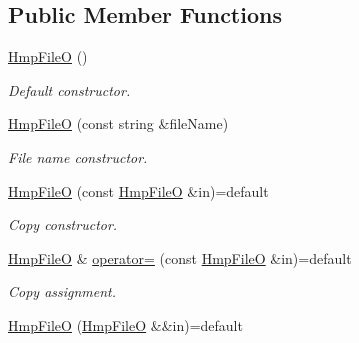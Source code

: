 \subsection*{Public Member Functions}
\begin{DoxyCompactItemize}
\item 
\mbox{\label{classvarfiles_1_1_hmp_file_o_ac33a1419124aa022ec6054394f546e21}} 
\hyperlink{classvarfiles_1_1_hmp_file_o_ac33a1419124aa022ec6054394f546e21}{Hmp\+FileO} ()
\begin{DoxyCompactList}\small\item\em Default constructor. \end{DoxyCompactList}\item 
\hyperlink{classvarfiles_1_1_hmp_file_o_aeede2bec2383f157cffeb9e1d5da5876}{Hmp\+FileO} (const string \&file\+Name)
\begin{DoxyCompactList}\small\item\em File name constructor. \end{DoxyCompactList}\item 
\mbox{\label{classvarfiles_1_1_hmp_file_o_a2821fee3f58be8c6d89e6383e54451f3}} 
\hyperlink{classvarfiles_1_1_hmp_file_o_a2821fee3f58be8c6d89e6383e54451f3}{Hmp\+FileO} (const \hyperlink{classvarfiles_1_1_hmp_file_o}{Hmp\+FileO} \&in)=default
\begin{DoxyCompactList}\small\item\em Copy constructor. \end{DoxyCompactList}\item 
\mbox{\label{classvarfiles_1_1_hmp_file_o_ac3fa68b3f30c40910116fcae3849ecea}} 
\hyperlink{classvarfiles_1_1_hmp_file_o}{Hmp\+FileO} \& \hyperlink{classvarfiles_1_1_hmp_file_o_ac3fa68b3f30c40910116fcae3849ecea}{operator=} (const \hyperlink{classvarfiles_1_1_hmp_file_o}{Hmp\+FileO} \&in)=default
\begin{DoxyCompactList}\small\item\em Copy assignment. \end{DoxyCompactList}\item 
\mbox{\label{classvarfiles_1_1_hmp_file_o_abab9d4c99be82a03341d1182e3ff66f5}} 
\hyperlink{classvarfiles_1_1_hmp_file_o_abab9d4c99be82a03341d1182e3ff66f5}{Hmp\+FileO} (\hyperlink{classvarfiles_1_1_hmp_file_o}{Hmp\+FileO} \&\&in)=default

\end{DoxyCompactItemize}
